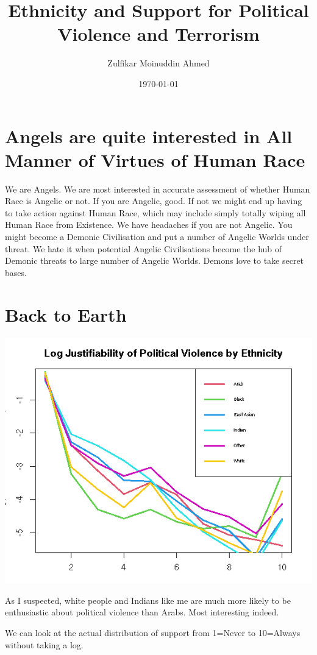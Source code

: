 \documentclass{amsart}
\title{Ethnicity and Support for Political Violence and Terrorism}
\author{Zulfikar Moinuddin Ahmed}
\date{\today}
\begin{document}
\maketitle

\section{Angels are quite interested in All Manner of Virtues of Human Race}

We are Angels.  We are most interested in accurate assessment of whether Human Race is Angelic or not.  If you are Angelic, good.  If not we might end up having to take action against Human Race, which may include simply totally wiping all Human Race from Existence.  We have headaches if you are not Angelic.  You might become a Demonic Civilisation and put a number of Angelic Worlds under threat.  We hate it when potential Angelic Civilisations become the hub of Demonic threats to large number of Angelic Worlds.  Demons love to take secret bases.

\section{Back to Earth}

\includegraphics[scale=0.8]{ethterror.jpeg}

As I suspected, white people and Indians like me are much more likely to be enthusiastic about political violence than Arabs.  Most interesting indeed.
 
We can look at the actual distribution of support from 1=Never to 10=Always without taking a log.
\end{document}
